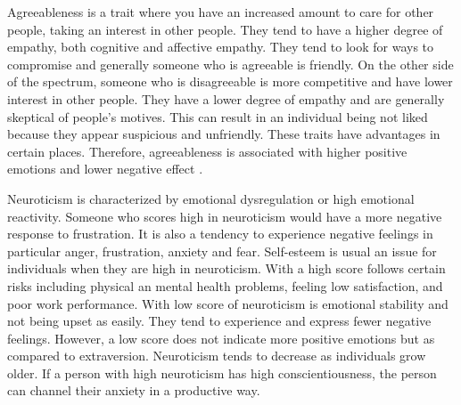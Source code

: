 Agreeableness is a trait where you have an increased amount to care for other people, taking an interest in other people. They tend to have a higher degree of empathy, both cognitive and affective empathy. They tend to look for ways to compromise and generally someone who is agreeable is friendly. On the other side of the spectrum, someone who is disagreeable is more competitive and have lower interest in other people. They have a lower degree of empathy and are generally skeptical of people's motives. This can result in an individual being not liked because they appear suspicious and unfriendly. These traits have advantages in certain places. Therefore, agreeableness is associated with higher positive emotions and lower negative effect \cite{personality_emotions_link}. 

Neuroticism is characterized by emotional dysregulation or high emotional reactivity. Someone who scores high in neuroticism would have a more negative response to frustration. It is also a tendency to experience negative feelings in particular anger, frustration, anxiety and fear. Self-esteem is usual an issue for individuals when they are high in neuroticism. With a high score follows certain risks including physical an mental health problems, feeling low satisfaction, and poor work performance. With low score of neuroticism is emotional stability and not being upset as easily. They tend to experience and express fewer negative feelings. However, a low score does not indicate more positive emotions but as compared to extraversion. Neuroticism tends to decrease as individuals grow older. If a person with high neuroticism has high conscientiousness, the person can channel their anxiety in a productive way. 




